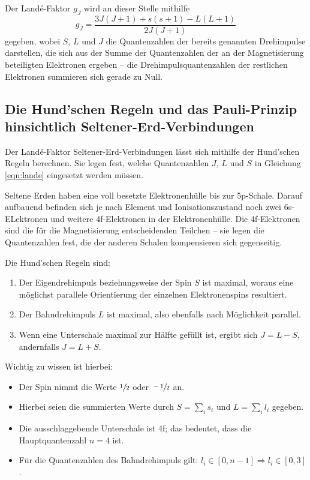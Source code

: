     Der Landé-Faktor $g_J$ wird an dieser Stelle mithilfe 
    \begin{equation}
        g_J=\frac{3J(J+1)+s(s+1)-L(L+1)}{2J(J+1)}
        \label{eqn:lande}
    \end{equation}
    gegeben, wobei $S$, $L$ und $J$ die Quantenzahlen der bereits genannten Drehimpulse darstellen, die sich aus der Summe
    der Quantenzahlen der an der Magnetisierung beteiligten Elektronen ergeben -- die Drehimpulsquantenzahlen der restlichen 
    Elektronen summieren sich gerade zu Null. 

\subsection{Die Hund'schen Regeln und das Pauli-Prinzip hinsichtlich Seltener-Erd-Verbindungen}
\label{sub:wauwau}

    Der Landé-Faktor Seltener-Erd-Verbindungen lässt sich mithilfe der Hund'schen Regeln berechnen. 
    Sie legen fest, welche Quantenzahlen $J$, $L$ und $S$ in Gleichung \eqref{eqn:lande} eingesetzt werden müssen. 

    Seltene Erden haben eine voll besetzte Elektronenhülle bis zur 5p-Schale. Darauf aufbauend befinden sich je nach 
    Element und Ionisationszustand noch zwei 6s-ELektronen und weitere 4f-Elektronen in der Elektronenhülle. 
    Die 4f-Elektronen sind die für die Magnetisierung entscheidenden Teilchen -- sie legen die Quantenzahlen fest, 
    die der anderen Schalen kompensieren sich gegenseitig. 

    Die Hund'schen Regeln sind:
    \begin{enumerate}
        \item Der Eigendrehimpuls beziehungsweise der Spin $S$ ist maximal, woraus eine möglichst parallele Orientierung 
            der einzelnen Elektronenspins resultiert.    
        \item Der Bahndrehimpuls $L$ ist maximal, also ebenfalls nach Möglichkeit parallel. 
        \item Wenn eine Unterschale maximal zur Hälfte gefüllt ist, ergibt sich ${J=L-S}$, andernfalls ${J=L+S}$.
    \end{enumerate}
    Wichtig zu wissen ist hierbei: 
    \begin{itemize}
        \item Der Spin nimmt die Werte $\sfrac{1}{2}$ oder $\sfrac{-1}{2}$ an. 
        \item Hierbei seien die summierten Werte durch $S=\sum_i s_i$ und $L=\sum_i l_i$ gegeben. 
        \item Die ausschlaggebende Unterschale ist 4f; das bedeutet, dass die Hauptquantenzahl ${n=4}$ ist.
        \item Für die Quantenzahlen des Bahndrehimpuls gilt: $l_i \in [0,n-1] \Rightarrow l_i \in [0,3]$ .
    \end{itemize}

